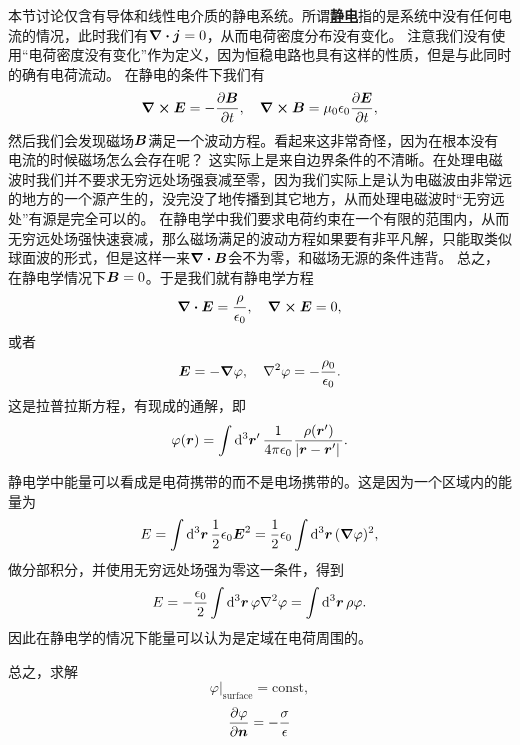 \documentclass[UTF8, a4paper]{ctexart}
\newcommand*{\const}{\mathrm{const}}
\newcommand*{\concept}[1]{\underline{\textbf{#1}}}
\begin{document}
本节讨论仅含有导体和线性电介质的静电系统。所谓\concept{静电}指的是系统中没有任何电流的情况，此时我们有$\div{\vb*{j}}=0$，从而电荷密度分布没有变化。
注意我们没有使用“电荷密度没有变化”作为定义，因为恒稳电路也具有这样的性质，但是与此同时的确有电荷流动。
在静电的条件下我们有
\[
    \curl{\vb*{E}} = - \pdv{\vb*{B}}{t}, \quad \curl{\vb*{B}} = \mu_0 \epsilon_0 \pdv{\vb*{E}}{t},
\]
然后我们会发现磁场$\vb*{B}$满足一个波动方程。看起来这非常奇怪，因为在根本没有电流的时候磁场怎么会存在呢？
这实际上是来自边界条件的不清晰。在处理电磁波时我们并不要求无穷远处场强衰减至零，因为我们实际上是认为电磁波由非常远的地方的一个源产生的，没完没了地传播到其它地方，从而处理电磁波时“无穷远处”有源是完全可以的。
在静电学中我们要求电荷约束在一个有限的范围内，从而无穷远处场强快速衰减，那么磁场满足的波动方程如果要有非平凡解，只能取类似球面波的形式，但是这样一来$\div{\vb*{B}}$会不为零，和磁场无源的条件违背。
总之，在静电学情况下$\vb*{B}=0$。于是我们就有静电学方程
\begin{equation}
    \div{\vb*{E}} = \frac{\rho}{\epsilon_0}, \quad \curl{\vb*{E}} = 0,
    \label{eq:static-e-field}
\end{equation}
或者
\begin{equation}
    \vb*{E} = - \grad{\varphi}, \quad \laplacian{\varphi} = - \frac{\rho_0}{\epsilon_0}.
    \label{eq:static-phi-field}
\end{equation}
这是拉普拉斯方程，有现成的通解，即
\begin{equation}
    \varphi(\vb*{r}) = \int \dd[3]{\vb*{r}'} \frac{1}{4\pi \epsilon_0} \frac{\rho(\vb*{r}')}{\abs*{\vb*{r} - \vb*{r}'}}.
    \label{eq:from-q-to-phi}
\end{equation}

静电学中能量可以看成是电荷携带的而不是电场携带的。这是因为一个区域内的能量为
\[
    E = \int \dd[3]{\vb*{r}} \frac{1}{2} \epsilon_0 \vb*{E}^2 = \frac{1}{2} \epsilon_0 \int \dd[3]{\vb*{r}} (\grad{\varphi})^2,
\]
做分部积分，并使用无穷远处场强为零这一条件，得到
\begin{equation}
    E = - \frac{\epsilon_0}{2} \int \dd[3]{\vb*{r}} \varphi \laplacian{\varphi} = \int \dd[3]{\vb*{r}} \rho \varphi.
\end{equation}
因此在静电学的情况下能量可以认为是定域在电荷周围的。

总之，求解
\begin{equation}
    \varphi|_\text{surface} = \const,
\end{equation}
\begin{equation}
    \pdv{\varphi}{\vb*{n}} = - \frac{\sigma}{\epsilon}
\end{equation}
\end{document}
